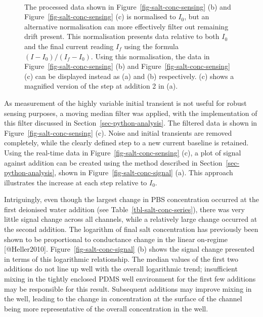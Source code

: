 \documentclass[
  letterpaper,
  DIV=11,
  numbers=noendperiod]{scrartcl}
\begin{document}
\begin{figure}
\begin{minipage}[t]{0.70\linewidth}
{{}

}

\end{minipage}%
%
\begin{minipage}[t]{0.15\linewidth}

{\centering 

~

}

\end{minipage}%

\caption{\label{fig-salt-conc-sensing-2}The processed data shown in
Figure~\ref{fig-salt-conc-sensing} (b) and
Figure~\ref{fig-salt-conc-sensing} (c) is normalised to \(I_{0}\), but
an alternative normalisation can more effectively filter out remaining
drift present. This normalisation presents data relative to both
\(I_{0}\) and the final current reading \(I_{f}\) using the formula
\((I - I_0)/(I_f - I_0)\). Using this normalisation, the data in
Figure~\ref{fig-salt-conc-sensing} (b) and
Figure~\ref{fig-salt-conc-sensing} (c) can be displayed instead as (a)
and (b) respectively. (c) shows a magnified version of the step at
addition 2 in (a).}

\end{figure}

As measurement of the highly variable initial transient is not useful
for robust sensing purposes, a moving median filter was applied, with
the implementation of this filter discussed in
Section~\ref{sec-python-analysis}. The filtered data is shown in
Figure~\ref{fig-salt-conc-sensing} (c). Noise and initial transients are
removed completely, while the clearly defined step to a new current
baseline is retained. Using the real-time data in
Figure~\ref{fig-salt-conc-sensing} (c), a plot of signal against
addition can be created using the method described in
Section~\ref{sec-python-analysis}, shown in
Figure~\ref{fig-salt-conc-signal} (a). This approach illustrates the
increase at each step relative to \(I_{0}\).

Intriguingly, even though the largest change in PBS concentration
occurred at the first deionised water addition (see
Table~\ref{tbl-salt-conc-series}), there was very little signal change
across all channels, while a relatively large change occurred at the
second addition. The logarithm of final salt concentration has
previously been shown to be proportional to conductance change in the
linear on-regime {[}@Heller2010{]}. Figure~\ref{fig-salt-conc-signal}
(b) shows the signal change presented in terms of this logarithmic
relationship. The median values of the first two additions do not line
up well with the overall logarithmic trend; insufficient mixing in the
tightly enclosed PDMS well environment for the first few additions may
be responsible for this result. Subsequent additions may improve mixing
in the well, leading to the change in concentration at the surface of
the channel being more representative of the overall concentration in
the well.
\end{document}
